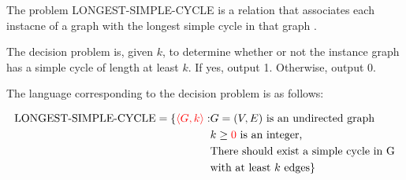 \documentclass[12pt]{article}
\begin{document}
\begin{enumerate}[1.]
\begin{mdframed}
    \bigskip

    The \color{red}problem LONGEST-SIMPLE-CYCLE is a relation that
    associates each instacne of a graph with the longest simple cycle in that graph \color{black}\color{black}.

    \bigskip

    The decision problem is, given $k$, to determine whether or not the instance graph
    has a simple cycle of length at least $k$. If yes, output 1. Otherwise, output 0.

    \bigskip

    The language corresponding to the decision problem is as follows:

    \begin{align*}
        \begin{split}
            \text{LONGEST-SIMPLE-CYCLE} = \{\color{red}\langle G,k\rangle\color{black}: &\text{$G = (V,E)$ is an undirected graph}\\
            &\text{$k \geq \color{red}0\color{black}$ is an integer,}\\
            &\text{There should exist a simple cycle in G}\\
            &\text{with at least $k$ edges}\}
        \end{split}
    \end{align*}
    \end{mdframed}














\end{enumerate}
\end{document}
